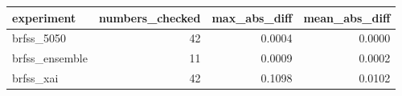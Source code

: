 \begin{tabular}{lrrr}
\toprule
experiment & numbers\_checked & max\_abs\_diff & mean\_abs\_diff \\
\midrule
brfss\_5050 & 42 & 0.0004 & 0.0000 \\
brfss\_ensemble & 11 & 0.0009 & 0.0002 \\
brfss\_xai & 42 & 0.1098 & 0.0102 \\
\bottomrule
\end{tabular}

